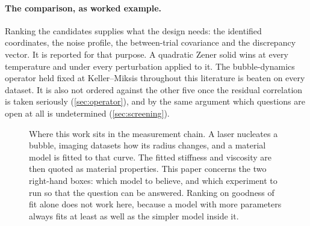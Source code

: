 \documentclass[10pt]{article}
\begin{document}
\paragraph{The comparison, as worked example.} Ranking the candidates supplies what the design
needs: the identified coordinates, the noise profile, the between-trial covariance and the
discrepancy vector. It is reported for that purpose. A quadratic Zener solid wins at every
temperature and under every perturbation applied to it. The bubble-dynamics operator held fixed
at Keller--Miksis throughout this literature is beaten on every dataset. It is also not ordered
against the other five once the residual correlation is taken seriously (\cref{sec:operator}),
and by the same argument which questions are open at all is undetermined (\cref{sec:screening}).


\begin{figure}[t]
\centering
{}
\caption{Where this work sits in the measurement chain. A laser nucleates a bubble, imaging
datasets how its radius changes, and a material model is fitted to that curve. The fitted
stiffness and viscosity are then quoted as material properties. This paper concerns the two
right-hand boxes: which model to believe, and which experiment to run so that the question can
be answered. Ranking on goodness of fit alone does not work here, because a model with more
parameters always fits at least as well as the simpler model inside it.}
\label{fig:pipeline}
\end{figure}
\end{document}
